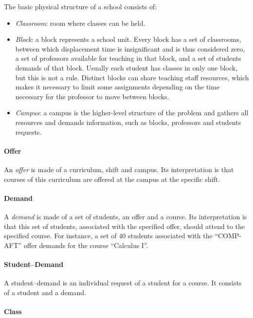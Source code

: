 The basic physical structure of a school consists of:
\begin{itemize}
\item \textit{Classroom}: room where classes can be held.
\item \textit{Block}: a block represents a school unit. Every block has a set of classrooms, between which displacement time is insignificant and is thus considered zero, a set of professors available for teaching in that block, and a set of students demands of that block. Usually each student has classes in only one block, but this is not a rule. Distinct blocks can share teaching staff resources, which makes it necessary to limit some assignments depending on the time necessary for the professor to move between blocks.
\item \textit{Campus}: a campus is the higher-level structure of the problem and gathers all resources and demands information, such as blocks, professors and students requests.
\end{itemize}


\paragraph{Offer}
\label{defoffer}
 
An \textit{offer} is made of a curriculum, shift and campus. Its interpretation is that courses of this curriculum are offered at the campus at the specific shift.


\paragraph{Demand}
 \label{defdem}

A \textit{demand} is made of a set of students, an offer and a course. Its interpretation is that this set of students, associated with the specified offer, should attend to the specified course.
For instance, a set of $40$ students associated with the ``COMP-AFT'' offer demands for the course ``Calculus I''.


\paragraph{Student--Demand}
\label{defstdem}

A student--demand is an individual request of a student for a course. It consists of a student and a demand.


\paragraph{Class}
\label{defclass}

